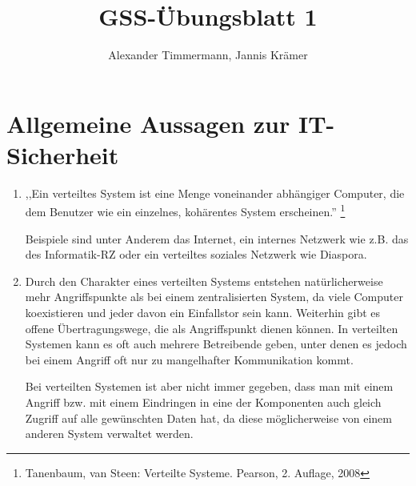 \documentclass[a4paper,11pt]{scrartcl}
\author{Alexander Timmermann, Jannis Krämer}
\title{GSS-Übungsblatt 1}
\date{}
\begin{document}
\maketitle
\thispagestyle{empty}

\section{Allgemeine Aussagen zur IT-Sicherheit}

\begin{enumerate}[1.]
    \item
        \begin{displayquote}
            ,,Ein verteiltes System ist eine Menge voneinander abhängiger Computer,
            die dem Benutzer wie ein einzelnes, kohärentes System erscheinen.''%
            \footnote{Tanenbaum, van Steen: Verteilte Systeme. Pearson, 2. Auflage, 2008}
        \end{displayquote}

        Beispiele sind unter Anderem das Internet, ein internes Netzwerk wie z.B.
        das des Informatik-RZ oder ein verteiltes soziales Netzwerk wie Diaspora.

    \item Durch den Charakter eines verteilten Systems entstehen natürlicherweise
          mehr Angriffspunkte als bei einem zentralisierten System, da viele Computer
          koexistieren und jeder davon ein Einfallstor sein kann. Weiterhin gibt
          es offene Übertragungswege, die als Angriffspunkt dienen können.
          In verteilten Systemen kann es oft auch mehrere Betreibende geben, unter
          denen es jedoch bei einem Angriff oft nur zu mangelhafter Kommunikation
          kommt.

          Bei verteilten Systemen ist aber nicht immer gegeben, dass man mit einem
          Angriff bzw. mit einem Eindringen in eine der Komponenten auch gleich
          Zugriff auf alle gewünschten Daten hat, da diese möglicherweise von
          einem anderen System verwaltet werden.


\end{enumerate}
\end{document}
